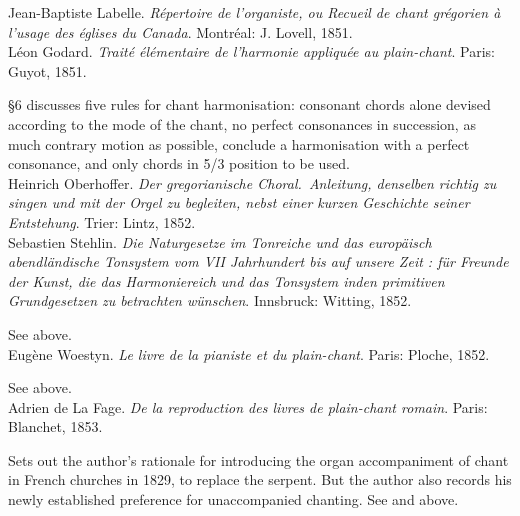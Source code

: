     \parindent=0pt
    \hangindent=0pt
  \covid{}Jean-Baptiste Labelle. \emph{Répertoire de l'organiste, ou Recueil de chant grégorien à l'usage des églises du Canada}. Montréal:  J. Lovell, 1851. \\

    \parindent=0pt
    \hangindent=0pt
  Léon Godard. \emph{Traité élémentaire de l'harmonie appliquée au plain-chant}. Paris:  Guyot, 1851.

     \parindent=20pt
     \hangindent=20pt
     \S{}6 discusses five rules for chant harmonisation: consonant chords alone devised according to the mode of the chant, no perfect consonances in succession, as much contrary motion as possible, conclude a harmonisation with a perfect consonance, and only chords in 5/3 position to be used.\\

    \parindent=0pt
    \hangindent=0pt
  \covid{}Heinrich Oberhoffer. \emph{Der gregorianische Choral.\ Anleitung, denselben richtig zu singen und mit der Orgel zu begleiten, nebst einer kurzen Geschichte seiner Entstehung}. Trier:  Lintz, 1852. \\

    \parindent=0pt
    \hangindent=0pt
  Sebastien Stehlin. \emph{Die Naturgesetze im Tonreiche und das europäisch abendländische Tonsystem vom VII Jahrhundert bis auf unsere Zeit : für Freunde der Kunst, die das Harmoniereich und das Tonsystem inden primitiven Grundgesetzen zu betrachten wünschen}. Innsbruck:  Witting, 1852.

     \parindent=20pt
     \hangindent=20pt
     See  above.\\

    \parindent=0pt
    \hangindent=0pt
  Eugène Woestyn. \emph{Le livre de la pianiste et du plain-chant}. Paris:  Ploche, 1852.

     \parindent=20pt
     \hangindent=20pt
     See  above.\\

    \parindent=0pt
    \hangindent=0pt
  Adrien de La Fage. \emph{De la reproduction des livres de plain-chant romain}. Paris:  Blanchet, 1853.

     \parindent=20pt
     \hangindent=20pt
     Sets out the author's rationale for introducing the organ accompaniment of chant in French churches in 1829, to replace the serpent. But the author also records his newly established preference for unaccompanied chanting. See  and  above.\\

